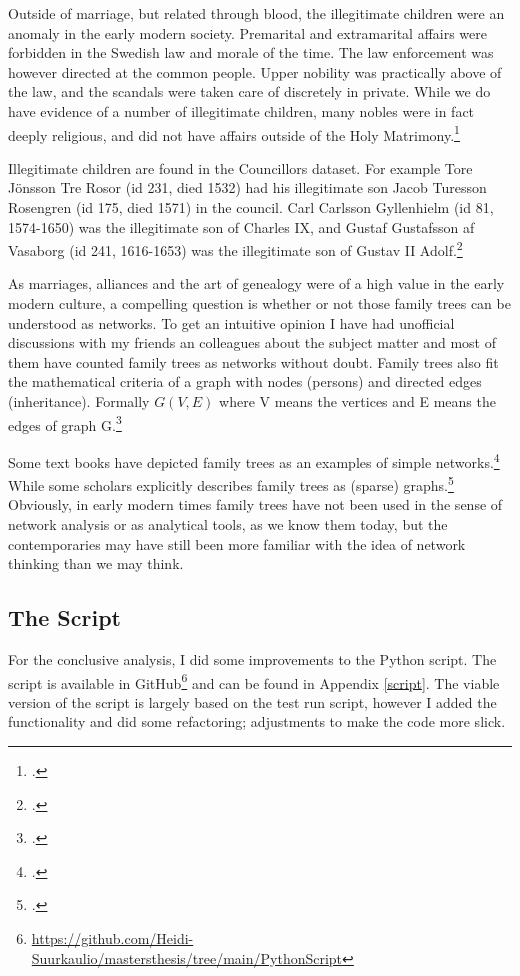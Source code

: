 Outside of marriage, but related through blood, the illegitimate children were an anomaly in the early modern society. Premarital and extramarital affairs were forbidden in the Swedish law and morale of the time. The law enforcement was however directed at the common people. Upper nobility was practically above of the law, and the scandals were taken care of discretely in private. While we do have evidence of a number of illegitimate children, many nobles were in fact deeply religious, and did not have affairs outside of the Holy Matrimony.\footcite[pp. 36-37.]{lappalainen06}

Illegitimate children are found in the Councillors dataset. For example Tore Jönsson Tre Rosor (id 231, died 1532) had his illegitimate son Jacob Turesson Rosengren (id 175, died 1571) in the council. Carl Carlsson Gyllenhielm (id 81, 1574-1650) was the illegitimate son of Charles IX, and Gustaf Gustafsson af Vasaborg (id 241, 1616-1653) was the illegitimate son of Gustav II Adolf.\footcite{councillorsDS}

As marriages, alliances and the art of genealogy were of a high value in the early modern culture, a compelling question is whether or not those family trees can be understood as networks. To get an intuitive opinion I have had unofficial discussions with my friends an colleagues about the subject matter and most of them have counted family trees as networks without doubt. Family trees also fit the mathematical criteria of a graph with nodes (persons) and directed edges (inheritance). Formally $G(V,E)$ where V means the vertices and E means the edges of graph G.\footcite[p. vii]{RajPM2018a}

Some text books have depicted family trees as an examples of simple networks.\footcite[See e. g.][p. 247.]{huhtamakiEtAl} While some scholars explicitly describes family trees as (sparse) graphs.\footcite{batagelj} Obviously, in early modern times family trees have not been used in the sense of network analysis or as analytical tools, as we know them today, but the contemporaries may have still been more familiar with the idea of network thinking than we may think.

\subsection{The Script}
For the conclusive analysis, I did some improvements to the Python script. The script is available in GitHub\footnote{\url{https://github.com/Heidi-Suurkaulio/mastersthesis/tree/main/PythonScript}} and can be found in Appendix \ref{script}. The viable version of the script is largely based on the test run script, however I added the functionality and did some refactoring; adjustments to make the code more slick. 

